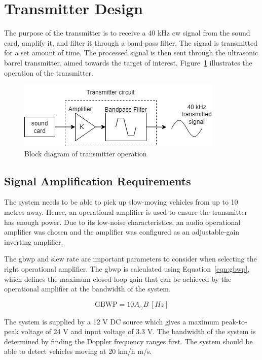 \documentclass[class=report,11pt,crop=false]{standalone}
\begin{document}
\section{Transmitter Design}\label{sect:transmitter-design}
The purpose of the transmitter is to receive a 40 kHz \gls{cw} signal from the sound card, amplify it, and filter it through a band-pass filter. The signal is transmitted for a set amount of time. The processed signal is then sent through the ultrasonic barrel transmitter, aimed towards the target of interest. Figure~\ref{fig:transmitter-block} illustrates the operation of the transmitter.

\begin{figure}[htbp]
    \centering
    \includegraphics[width=0.6\columnwidth]{../Images/transmitter_block.drawio.png}
    \caption{Block diagram of transmitter operation}
    \label{fig:transmitter-block}
\end{figure}

\subsection{Signal Amplification Requirements}\label{sect:transmitter-signal-amplification}
The system needs to be able to pick up slow-moving vehicles from up to 10 metres away. Hence, an operational amplifier is used to ensure the transmitter has enough power. Due to its low-noise characteristics, an audio operational amplifier was chosen and the amplifier was configured as an adjustable-gain inverting amplifier.

The \gls{gbwp} and slew rate are important parameters to consider when selecting the right operational amplifier. The \gls{gbwp} is calculated using Equation~\ref{eqn:gbwp}, which defines the maximum closed-loop gain that can be achieved by the operational amplifier at the bandwidth of the system.

\begin{equation}
    \text{GBWP} = 10 A_c_l B\:[Hz]
    \label{eqn:gbwp}
\end{equation}

The system is supplied by a 12 V DC source which gives a maximum peak-to-peak voltage of 24 V and input voltage of 3.3 V. The bandwidth of the system is determined by finding the Doppler frequency ranges first. The system should be able to detect vehicles moving at 20 km/h  m/s.
\end{document}
